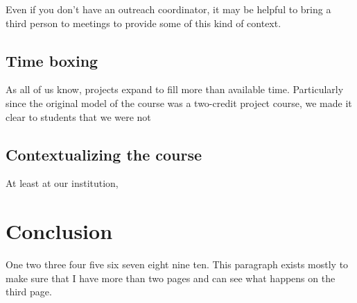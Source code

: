 Even if you don't have an outreach coordinator, it may be helpful to
bring a third person to meetings to provide some of this kind of context.

\subsection{Time boxing}

As all of us know, projects expand to fill more than available time.
Particularly since the original model of the course was a two-credit
project course, we made it clear to students that we were not 

\subsection{Contextualizing the course}

At least at our institution, 

\section{Conclusion}

One two three four five six seven eight nine ten.  This paragraph exists
mostly to make sure that I have more than two pages and can see what
happens on the third page.
